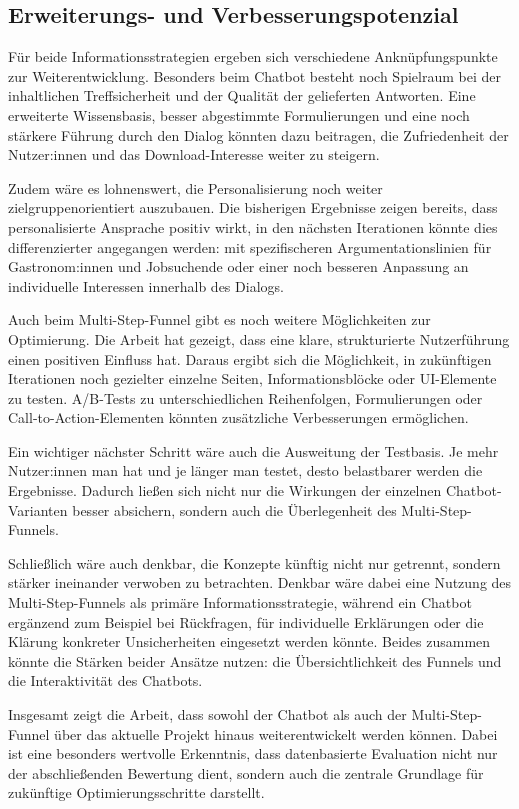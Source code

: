 \subsection{Erweiterungs- und Verbesserungspotenzial}

Für beide Informationsstrategien ergeben sich verschiedene Anknüpfungspunkte 
zur Weiterentwicklung. Besonders beim Chatbot besteht noch Spielraum bei der 
inhaltlichen Treffsicherheit und der Qualität der gelieferten Antworten. Eine 
erweiterte Wissensbasis, besser abgestimmte Formulierungen und eine noch 
stärkere Führung durch den Dialog könnten dazu beitragen, die Zufriedenheit 
der Nutzer:innen und das Download-Interesse weiter zu steigern.

Zudem wäre es lohnenswert, die Personalisierung noch weiter 
zielgruppenorientiert auszubauen. Die bisherigen Ergebnisse zeigen bereits, 
dass personalisierte Ansprache positiv wirkt, in den nächsten Iterationen könnte 
dies differenzierter angegangen werden: mit spezifischeren Argumentationslinien 
für Gastronom:innen und Jobsuchende oder einer noch besseren Anpassung an 
individuelle Interessen innerhalb des Dialogs.

Auch beim Multi-Step-Funnel gibt es noch weitere Möglichkeiten zur Optimierung. 
Die Arbeit hat gezeigt, dass eine klare, strukturierte Nutzerführung einen positiven Einfluss hat. 
Daraus ergibt sich die Möglichkeit, in zukünftigen Iterationen noch gezielter 
einzelne Seiten, Informationsblöcke oder UI-Elemente zu testen. A/B-Tests zu 
unterschiedlichen Reihenfolgen, Formulierungen oder Call-to-Action-Elementen 
könnten zusätzliche Verbesserungen ermöglichen.

Ein wichtiger nächster Schritt wäre auch die Ausweitung der Testbasis. Je mehr Nutzer:innen man hat und je länger man testet, desto belastbarer werden die Ergebnisse. Dadurch ließen sich nicht nur die Wirkungen der einzelnen Chatbot-Varianten besser absichern, sondern auch die Überlegenheit des Multi-Step-Funnels.

Schließlich wäre auch denkbar, die Konzepte künftig nicht nur getrennt, sondern stärker ineinander verwoben zu betrachten. Denkbar wäre dabei eine Nutzung des Multi-Step-Funnels als primäre Informationsstrategie, während ein Chatbot ergänzend zum Beispiel bei Rückfragen, für individuelle Erklärungen oder die Klärung konkreter Unsicherheiten eingesetzt werden könnte. Beides zusammen könnte die Stärken beider Ansätze nutzen: die Übersichtlichkeit des Funnels und die Interaktivität des Chatbots.

Insgesamt zeigt die Arbeit, dass sowohl der Chatbot als auch der Multi-Step-Funnel über das aktuelle Projekt hinaus weiterentwickelt werden können. Dabei ist eine besonders wertvolle Erkenntnis, dass datenbasierte Evaluation nicht nur der abschließenden Bewertung dient, sondern auch die zentrale Grundlage für zukünftige Optimierungsschritte darstellt.
